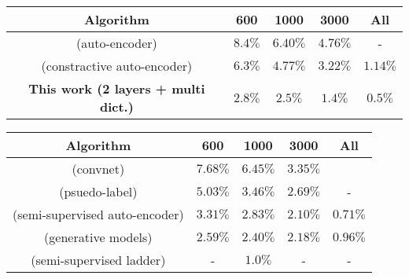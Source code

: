 \documentclass{article} \usepackage{iclr2016_workshop,times}
\begin{document}
\begin{table*}[ht!]

\caption{Classification error on MNIST.}
\label{mnist-results}
\begin{subtable}{\linewidth}
 \centering
 \caption{
 Algorithms that learn the filters unsupervised.}
\begin{tabular}{ccccc}
\multicolumn{1}{c}{\bf Algorithm}   &\multicolumn{1}{c}{\bf 600} &\multicolumn{1}{c}{\bf 1000} &\multicolumn{1}{c}{\bf 3000} &\multicolumn{1}{c}{\bf All}\\ \hline 
\cite{zhao2015stacked} (auto-encoder)                                   &$8.4  \%$       &$6.40  \%$         &$4.76 \%$         &- \\
\cite{rifai2011contractive} (constractive auto-encoder)            &$6.3  \%$       &$4.77  \%$         &$3.22  \%$       &$1.14  \%$\\
\textbf{This work (2 layers + multi dict.)}                                  &$2.8 \%$        &$2.5  \%$          &$1.4 \%$           &$0.5 \%$ \\
 \hline


\end{tabular}
\end{subtable}

\vspace{4mm}

 \begin{subtable}{\linewidth}
 \centering
 \caption{Supervised and semi-supervised algorithms.}
\begin{tabular}{ccccc}
\multicolumn{1}{c}{\bf Algorithm} &\multicolumn{1}{c}{\bf 600} &\multicolumn{1}{c}{\bf 1000} &\multicolumn{1}{c}{\bf 3000}  &\multicolumn{1}{c}{\bf All}\\ \hline
 \cite{lecun1998gradient} (convnet)                                                         &$7.68\%$                       &$6.45\%$                     &$3.35\%$ \\  
  \cite{lee2013pseudo} (psuedo-label)                                                     &$5.03\%$                       &$3.46\%$                     &$2.69\%$                    &- \\  
    \cite{zhao2015stacked} (semi-supervised auto-encoder)                   &$3.31\%$                       &$2.83\%$                     &$2.10\%$                     &$0.71\%$\\
  \cite{kingma2014semi} (generative models)                                         &$2.59\%$                       &$2.40\%$                      &$2.18\%$                    &$0.96\%$\\
  \cite{rasmus2015semi} (semi-supervised ladder)                                 &-                                     &$1.0\%$                       &-                                   &- \\
   \hline

\end{tabular}
\end{subtable}
\end{table*}
\end{document}

